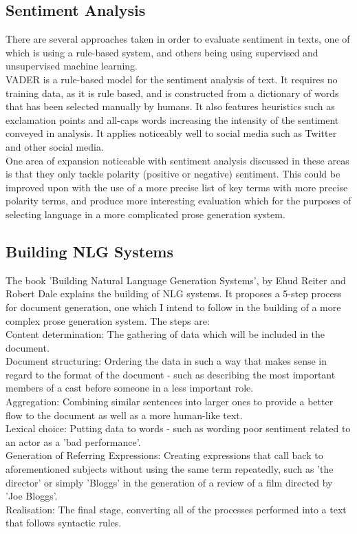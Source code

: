 \subsection{Sentiment Analysis}
There are several approaches taken in order to evaluate sentiment in texts, one of which is using a rule-based system, and others being using supervised and unsupervised machine learning.\\

VADER is a rule-based model for the sentiment analysis of text\cite{Vader}. It requires no training data, as it is rule based, and is constructed from a dictionary of words that has been selected manually by humans. It also features heuristics such as exclamation points and all-caps words increasing the intensity of the sentiment conveyed in analysis. It applies noticeably well to social media such as Twitter and other social media.\\

One area of expansion noticeable with sentiment analysis discussed in these areas is that they only tackle polarity (positive or negative) sentiment. This could be improved upon with the use of a more precise list of key terms with more precise polarity terms, and produce more interesting evaluation which for the purposes of selecting language in a more complicated prose generation system.

\subsection{Building NLG Systems}
The book 'Building Natural Language Generation Systems', by Ehud Reiter and Robert Dale explains the building of NLG systems. It proposes a 5-step process for document generation, one which I intend to follow in the building of a more complex prose generation system. The steps are:\\
Content determination: The gathering of data which will be included in the document.\cite{BuildingNLG}\\
Document structuring: Ordering the data in such a way that makes sense in regard to the format of the document - such as describing the most important members of a cast before someone in a less important role.\\
Aggregation: Combining similar sentences into larger ones to provide a better flow to the document as well as a more human-like text.\\
Lexical choice: Putting data to words - such as wording poor sentiment related to an actor as a 'bad performance'.\\
Generation of Referring Expressions: Creating expressions that call back to aforementioned subjects without using the same term repeatedly, such as 'the director' or simply 'Bloggs' in the generation of a review of a film directed by 'Joe Bloggs'.\\
Realisation: The final stage, converting all of the processes performed into a text that follows syntactic rules.\\

